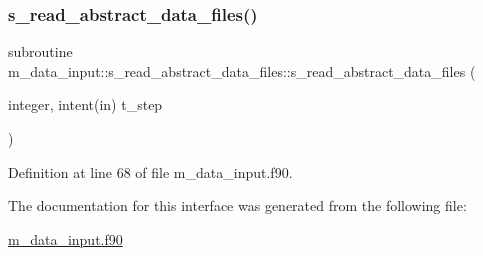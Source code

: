 \subsubsection{\texorpdfstring{s\+\_\+read\+\_\+abstract\+\_\+data\+\_\+files()}{s\_read\_abstract\_data\_files()}}
{\footnotesize\ttfamily subroutine m\+\_\+data\+\_\+input\+::s\+\_\+read\+\_\+abstract\+\_\+data\+\_\+files\+::s\+\_\+read\+\_\+abstract\+\_\+data\+\_\+files (\begin{DoxyParamCaption}\item[{integer, intent(in)}]{t\+\_\+step }\end{DoxyParamCaption})}



Definition at line 68 of file m\+\_\+data\+\_\+input.\+f90.



The documentation for this interface was generated from the following file\+:\begin{DoxyCompactItemize}
\item 
\hyperlink{m__data__input_8f90}{m\+\_\+data\+\_\+input.\+f90}\end{DoxyCompactItemize}
